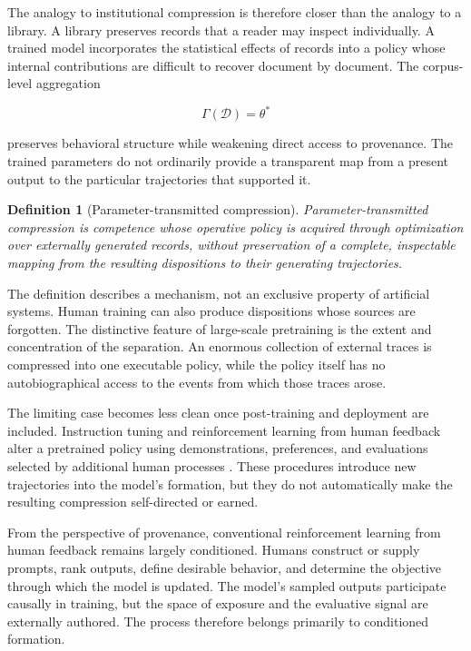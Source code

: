 \documentclass[11pt]{article}
\newtheorem{definition}[proposition]{Definition}
\begin{document}
The analogy to institutional compression is therefore closer than the analogy to a library. A library preserves records that a reader may inspect individually. A trained model incorporates the statistical effects of records into a policy whose internal contributions are difficult to recover document by document. The corpus-level aggregation

\[
\Gamma(\mathcal{D})
=
\theta^{*}
\]

preserves behavioral structure while weakening direct access to provenance. The trained parameters do not ordinarily provide a transparent map from a present output to the particular trajectories that supported it.

\begin{definition}[Parameter-transmitted compression]
Parameter-transmitted compression is competence whose operative policy is acquired through optimization over externally generated records, without preservation of a complete, inspectable mapping from the resulting dispositions to their generating trajectories.
\end{definition}

The definition describes a mechanism, not an exclusive property of artificial systems. Human training can also produce dispositions whose sources are forgotten. The distinctive feature of large-scale pretraining is the extent and concentration of the separation. An enormous collection of external traces is compressed into one executable policy, while the policy itself has no autobiographical access to the events from which those traces arose.

The limiting case becomes less clean once post-training and deployment are included. Instruction tuning and reinforcement learning from human feedback alter a pretrained policy using demonstrations, preferences, and evaluations selected by additional human processes \cite{ouyang2022}. These procedures introduce new trajectories into the model's formation, but they do not automatically make the resulting compression self-directed or earned.

From the perspective of provenance, conventional reinforcement learning from human feedback remains largely conditioned. Humans construct or supply prompts, rank outputs, define desirable behavior, and determine the objective through which the model is updated. The model's sampled outputs participate causally in training, but the space of exposure and the evaluative signal are externally authored. The process therefore belongs primarily to conditioned formation.
\end{document}
